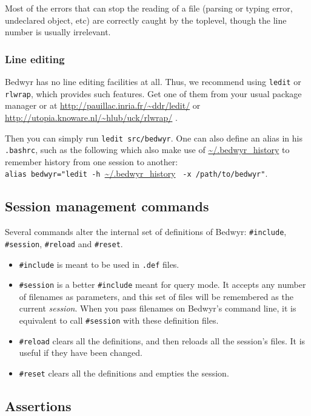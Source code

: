 \documentclass{article}
\begin{document}
Most of the errors that can stop the reading of a file (parsing or
typing error, undeclared object, etc) are correctly caught by the
toplevel, though the line number is usually irrelevant.

\subsubsection{Line editing}

Bedwyr has no line editing facilities at all. Thus, we recommend using
\texttt{ledit} or \texttt{rlwrap}, which provides such features. Get one
of them from your usual package manager or at
\urldef{\thisurl}\url{http://pauillac.inria.fr/~ddr/ledit/}\ahrefurl{\thisurl}
or \urldef{\thisurl}\url{http://utopia.knoware.nl/~hlub/uck/rlwrap/}
\ahrefurl{\thisurl}.


Then you can simply run \verb.ledit src/bedwyr.. One can also define
an alias in his \verb;.bashrc;, such as the following which also
make use of \url{~/.bedwyr_history} to remember history from one session to
another:\\
\verb|alias bedwyr="ledit -h |\url{~/.bedwyr_history}%
\verb| -x /path/to/bedwyr"|.

\subsection{Session management commands}

Several commands alter the internal set of definitions of Bedwyr:
\verb.#include., \verb.#session., \verb.#reload. and \verb.#reset..
\begin{itemize}
  \item
    \verb.#include. is meant to be used in \verb;.def; files.
  \item
    \verb.#session. is a better \verb.#include. meant for query mode.
    It accepts any number of filenames as parameters, and this set of files
    will be remembered as the current \emph{session}.
    When you pass filenames on Bedwyr's command line,
    it is equivalent to call \verb.#session. with these definition files.
  \item
    \verb.#reload. clears all the definitions,
    and then reloads all the session's files. It is useful if they have
    been changed.
  \item
    \verb.#reset. clears all the definitions and empties the session.
\end{itemize}

\subsection{Assertions}
\end{document}
